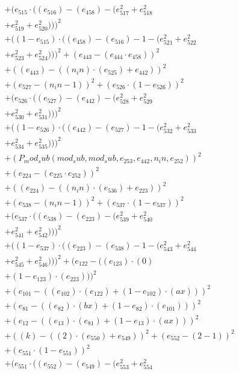 \documentclass[10pt, a4paper]{article}
\begin{document}
\begin{align*}
& + (e_{515}  \cdot  ((e_{516}) - (e_{458}) - (e_{517}^{2} + e_{518}^{2} \\
& + e_{519}^{2} + e_{520}^{2})))^{2} \\
& + ((1 - e_{515})  \cdot  ((e_{458}) - (e_{516}) - 1 - (e_{521}^{2} + e_{522}^{2} \\
& + e_{523}^{2} + e_{524}^{2})))^{2} + (e_{443} - (e_{444}  \cdot  e_{458}))^{2} \\
& + ((e_{443}) - ((n_in)  \cdot  (e_{525}) + e_{442}))^{2} \\
& + (e_{527} - (n_in - 1))^{2} + (e_{526}  \cdot  (1 - e_{526}))^{2} \\
& + (e_{526}  \cdot  ((e_{527}) - (e_{442}) - (e_{528}^{2} + e_{529}^{2} \\
& + e_{530}^{2} + e_{531}^{2})))^{2} \\
& + ((1 - e_{526})  \cdot  ((e_{442}) - (e_{527}) - 1 - (e_{532}^{2} + e_{533}^{2} \\
& + e_{534}^{2} + e_{535}^{2})))^{2} \\
& + (P_mod_sub(mod_sub, mod_sub, e_{253}, e_{442}, n_in, e_{252}))^{2} \\
& + (e_{224} - (e_{225}  \cdot  e_{252}))^{2} \\
& + ((e_{224}) - ((n_in)  \cdot  (e_{536}) + e_{223}))^{2} \\
& + (e_{538} - (n_in - 1))^{2} + (e_{537}  \cdot  (1 - e_{537}))^{2} \\
& + (e_{537}  \cdot  ((e_{538}) - (e_{223}) - (e_{539}^{2} + e_{540}^{2} \\
& + e_{541}^{2} + e_{542}^{2})))^{2} \\
& + ((1 - e_{537})  \cdot  ((e_{223}) - (e_{538}) - 1 - (e_{543}^{2} + e_{544}^{2} \\
& + e_{545}^{2} + e_{546}^{2})))^{2} + (e_{122} - ((e_{123})  \cdot  (0) \\
& + (1 - e_{123})  \cdot  (e_{223})))^{2} \\
& + (e_{101} - ((e_{102})  \cdot  (e_{122}) + (1 - e_{102})  \cdot  (ax)))^{2} \\
& + (e_{81} - ((e_{82})  \cdot  (bx) + (1 - e_{82})  \cdot  (e_{101})))^{2} \\
& + (e_{12} - ((e_{13})  \cdot  (e_{81}) + (1 - e_{13})  \cdot  (ax)))^{2} \\
& + ((k) - ((2)  \cdot  (e_{550}) + e_{549}))^{2} + (e_{552} - (2 - 1))^{2} \\
& + (e_{551}  \cdot  (1 - e_{551}))^{2} \\
& + (e_{551}  \cdot  ((e_{552}) - (e_{549}) - (e_{553}^{2} + e_{554}^{2} \\

\end{align*}
\end{document}
